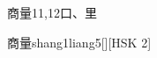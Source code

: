 \begin{entry}{商量}{11,12}{⼝、⾥}
  \begin{phonetics}{商量}{shang1liang5}[][HSK 2]
  \end{phonetics}
\end{entry}
